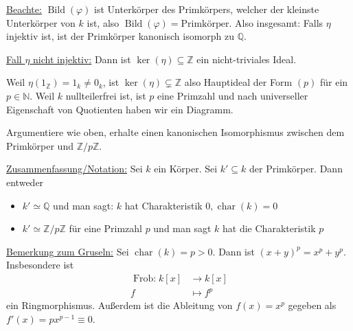 \documentclass[a4paper,12pt,numbers=noenddot,parskip=full]{scrartcl}
\newcommand{\setN}{\mathbb{N}}
\newcommand{\setZ}{\mathbb{Z}}
\newcommand{\setQ}{\mathbb{Q}}
\newcommand{\heading}{\underline}
\theoremstyle{dotless}
\theoremstyle{remark}
\begin{document}
	\heading{Beachte:} $\operatorname{Bild}(\varphi)$ ist Unterkörper des Primkörpers, welcher der kleinste Unterkörper von $k$ ist, also $\operatorname{Bild}(\varphi) = \text{Primkörper}$. Also insgesamt: Falls $\eta$ injektiv ist, ist der Primkörper kanonisch isomorph zu $\setQ$.
	
	\heading{Fall $\eta$ nicht injektiv:} Dann ist $\ker(\eta) \subseteq \setZ$ ein nicht-triviales Ideal.
	
	Weil $\eta(1_\setZ) = 1_k \neq 0_k$, ist $\ker(\eta) \subsetneq \setZ$ also Hauptideal der Form $(p)$ für ein $p \in \setN$. Weil $k$ nullteilerfrei ist, ist $p$ eine Primzahl und nach universeller Eigenschaft von Quotienten haben wir ein Diagramm.
	
	\begin{center}
	\end{center}

	Argumentiere wie oben, erhalte einen kanonischen Isomorphismus zwischen dem Primkörper und $\setZ / p \setZ$.
	
	\heading{Zusammenfassung/Notation:} Sei $k$ ein Körper. Sei $k' \subseteq k$ der Primkörper. Dann entweder
	\begin{itemize}
		\item $k' \simeq \setQ$ und man sagt: $k$ hat Charakteristik $0, \operatorname{char}(k) = 0$
		\item $k' \simeq \setZ / p \setZ$ für eine Primzahl $p$ und man sagt $k$ hat die Charakteristik $p$
	\end{itemize}

	\heading{Bemerkung zum Gruseln:} Sei $\operatorname{char}(k) = p > 0$. Dann ist $(x + y)^p = x^p + y^p$. Insbesondere ist
	\begin{align*}
		\operatorname{Frob:} k[x] &\to k[x] \\
		f &\mapsto f^p
	\end{align*}
	ein Ringmorphismus. Außerdem ist die Ableitung von $f(x) = x^p$ gegeben als $f'(x) = p x^{p-1} \equiv 0$.
	
\end{document}
